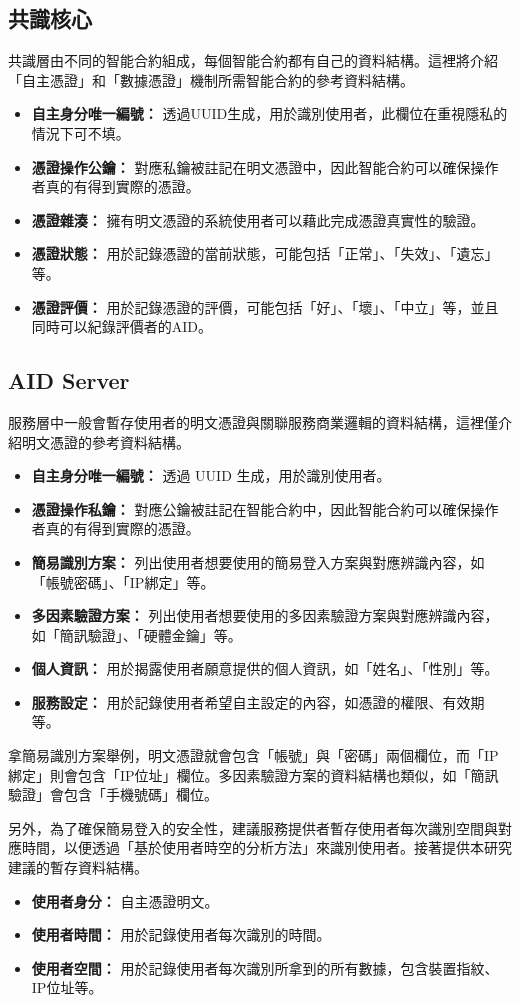 \subsection{共識核心}
共識層由不同的智能合約組成，每個智能合約都有自己的資料結構。這裡將介紹「自主憑證」和「數據憑證」機制所需智能合約的參考資料結構。
\begin{itemize}
  \item \textbf{自主身分唯一編號：} 透過UUID生成，用於識別使用者，此欄位在重視隱私的情況下可不填。
  \item \textbf{憑證操作公鑰：} 對應私鑰被註記在明文憑證中，因此智能合約可以確保操作者真的有得到實際的憑證。
  \item \textbf{憑證雜湊：} 擁有明文憑證的系統使用者可以藉此完成憑證真實性的驗證。
  \item \textbf{憑證狀態：} 用於記錄憑證的當前狀態，可能包括「正常」、「失效」、「遺忘」等。
  \item \textbf{憑證評價：} 用於記錄憑證的評價，可能包括「好」、「壞」、「中立」等，並且同時可以紀錄評價者的AID。
\end{itemize}
\subsection{AID Server}
服務層中一般會暫存使用者的明文憑證與關聯服務商業邏輯的資料結構，這裡僅介紹明文憑證的參考資料結構。
\begin{itemize}
  \item \textbf{自主身分唯一編號：} 透過 UUID 生成，用於識別使用者。
  \item \textbf{憑證操作私鑰：} 對應公鑰被註記在智能合約中，因此智能合約可以確保操作者真的有得到實際的憑證。
  \item \textbf{簡易識別方案：} 列出使用者想要使用的簡易登入方案與對應辨識內容，如「帳號密碼」、「IP綁定」等。
  \item \textbf{多因素驗證方案：} 列出使用者想要使用的多因素驗證方案與對應辨識內容，如「簡訊驗證」、「硬體金鑰」等。
  \item \textbf{個人資訊：} 用於揭露使用者願意提供的個人資訊，如「姓名」、「性別」等。
  \item \textbf{服務設定：} 用於記錄使用者希望自主設定的內容，如憑證的權限、有效期等。
\end{itemize}
拿簡易識別方案舉例，明文憑證就會包含「帳號」與「密碼」兩個欄位，而「IP綁定」則會包含「IP位址」欄位。多因素驗證方案的資料結構也類似，如「簡訊驗證」會包含「手機號碼」欄位。

另外，為了確保簡易登入的安全性，建議服務提供者暫存使用者每次識別空間與對應時間，以便透過「基於使用者時空的分析方法」來識別使用者。接著提供本研究建議的暫存資料結構。
\begin{itemize}
  \item \textbf{使用者身分：} 自主憑證明文。
  \item \textbf{使用者時間：} 用於記錄使用者每次識別的時間。
  \item \textbf{使用者空間：} 用於記錄使用者每次識別所拿到的所有數據，包含裝置指紋、IP位址等。
\end{itemize}

